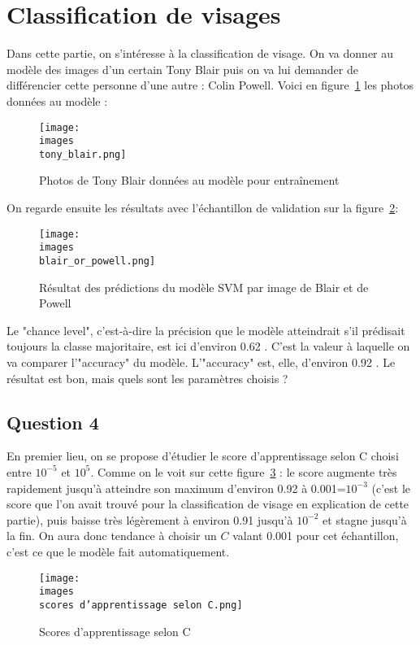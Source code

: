 \documentclass[11pt,a4paper]{article}
\begin{document}
\section*{Classification de visages}
Dans cette partie, on s'intéresse à la classification de visage. On va donner au modèle des images d'un certain Tony Blair puis on va lui demander de différencier cette personne d'une autre : Colin Powell. Voici en figure~\ref{blair} les photos données au modèle :
\begin{figure}[H]
    \centering
    \texttt{[image: \\images\\tony\_blair.png]}
    \caption{Photos de Tony Blair données au modèle pour entraînement}
    \label{blair}
\end{figure}
On regarde ensuite les résultats avec l'échantillon de validation sur la figure~\ref{blair_or_powell}: \\
\begin{figure}[H]
    \centering
    \texttt{[image: \\images\\blair\_or\_powell.png]}
    \caption{Résultat des prédictions du modèle SVM par image de Blair et de Powell}
    \label{blair_or_powell}
\end{figure}
Le "chance level", c'est-à-dire la précision que le modèle atteindrait s'il prédisait toujours la classe majoritaire, est ici d'environ 0.62 . C'est la valeur à laquelle on va comparer l'"accuracy" du modèle. L'"accuracy" est, elle, d'environ 0.92 . Le résultat est bon, mais quels sont les paramètres choisis ?

\subsection*{Question 4}
En premier lieu, on se propose d'étudier le score d'apprentissage selon C choisi entre $10^{-5}$ et $10^{5}$. Comme on le voit sur cette figure~\ref{scores-selon-C} : le score augmente très rapidement jusqu'à atteindre son maximum d'environ 0.92 à 0.001=$10^{-3}$ (c'est le score que l'on avait trouvé pour la classification de visage en explication de cette partie), puis baisse très légèrement à environ 0.91 jusqu'à $10^{-2}$ et stagne jusqu'à la fin. On aura donc tendance à choisir un $C$ valant 0.001 pour cet échantillon, c'est ce que le modèle fait automatiquement.
\begin{figure}[H]
    \centering
    \texttt{[image: \\images\\scores d'apprentissage selon C.png]}
    \caption{Scores d'apprentissage selon C}
    \label{scores-selon-C}
\end{figure}
\end{document}
